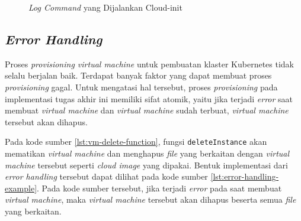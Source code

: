 \begin{figure}[H]
  \centering
  \caption{\emph{Log Command} yang Dijalankan Cloud-init}
  \label{fig:log-output-cloud-init}
\end{figure}

\subsection{\emph{Error Handling}}
\label{subsec:error-handling}

Proses \emph{provisioning virtual machine} untuk pembuatan
klaster Kubernetes tidak selalu berjalan baik. Terdapat banyak
faktor yang dapat membuat proses \emph{provisioning} gagal. Untuk
mengatasi hal tersebut, proses \emph{provisioning} pada implementasi
tugas akhir ini memiliki sifat atomik, yaitu jika terjadi \emph{error}
saat membuat \emph{virtual machine} dan \emph{virtual machine} sudah terbuat,
\emph{virtual machine} tersebut akan dihapus.





Pada kode sumber \ref{lst:vm-delete-function}, fungsi \lstinline{deleteInstance}
akan mematikan \emph{virtual machine} dan menghapus \emph{file} yang berkaitan
dengan \emph{virtual machine} tersebut seperti \emph{cloud image} yang dipakai.
Bentuk implementasi dari \emph{error handling} tersebut dapat dilihat pada kode
sumber \ref{lst:error-handling-example}. Pada kode sumber tersebut, jika terjadi
\emph{error} pada saat membuat \emph{virtual machine}, maka \emph{virtual machine}
tersebut akan dihapus beserta semua \emph{file} yang berkaitan.

